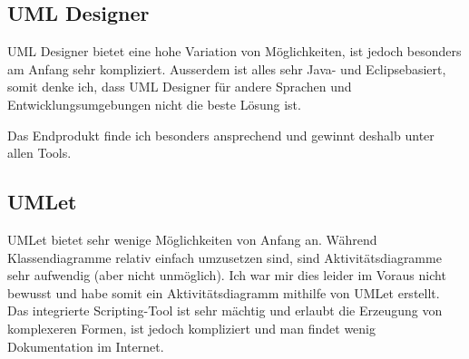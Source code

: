 \documentclass[a4paper, titlepage]{scrartcl}
\begin{document}
    \subsection{UML Designer}
    UML Designer bietet eine hohe Variation von Möglichkeiten, ist jedoch besonders
    am Anfang sehr kompliziert. Ausserdem ist alles sehr Java- und Eclipsebasiert,
    somit denke ich, dass UML Designer für andere Sprachen und Entwicklungsumgebungen
    nicht die beste Lösung ist.

    Das Endprodukt finde ich besonders ansprechend und gewinnt deshalb unter allen Tools.

    \subsection{UMLet}
    UMLet bietet sehr wenige Möglichkeiten von Anfang an. Während Klassendiagramme
    relativ einfach umzusetzen sind, sind Aktivitätsdiagramme sehr aufwendig (aber
    nicht unmöglich). Ich war mir dies leider im Voraus nicht bewusst und habe somit
    ein Aktivitätsdiagramm mithilfe von UMLet erstellt. Das integrierte Scripting-Tool
    ist sehr mächtig und erlaubt die Erzeugung von komplexeren Formen, ist jedoch
    kompliziert und man findet wenig Dokumentation im Internet. 
    
\end{document}
